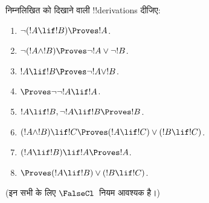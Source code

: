 \documentclass[../../../include/open-logic-section]{subfiles}
\begin{document}
\begin{prob}
निम्नलिखित को दिखाने वाली !!{derivation}s दीजिए:
\begin{enumerate}
\item $\lnot(!A \lif !B) \Proves !A$.
\item $\lnot(!A \land !B) \Proves \lnot !A \lor \lnot !B$.
\item $!A \lif !B \Proves \lnot !A \lor !B$.
\item $\Proves \lnot \lnot !A \lif !A$.
\item $!A \lif !B, \lnot !A \lif !B \Proves !B$.
\item $(!A \land !B) \lif !C \Proves (!A \lif !C) \lor (!B \lif !C)$.
\item $(!A \lif !B) \lif !A \Proves !A$.
\item $\Proves (!A \lif !B) \lor (!B \lif !C)$.
\end{enumerate}
(इन सभी के लिए $\FalseCl$~नियम आवश्यक है।)
\end{prob}
\end{document}
